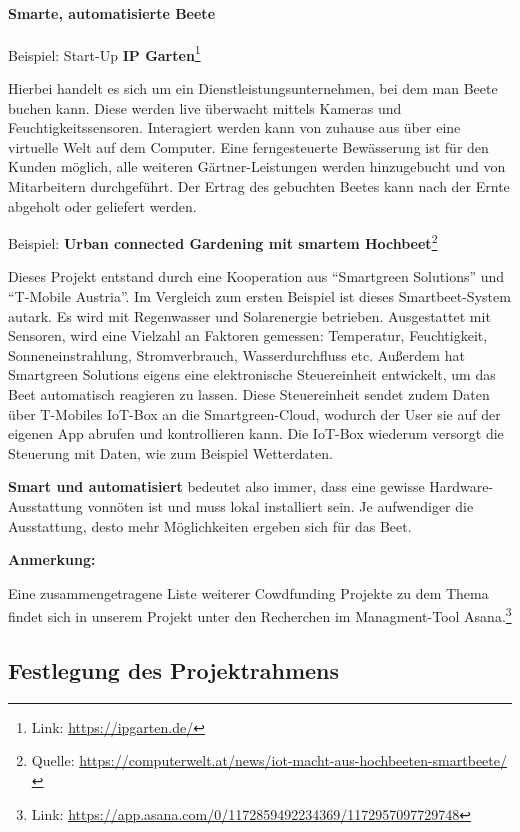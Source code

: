 \hypertarget{smarte-automatisierte-beete}{%
\paragraph{Smarte, automatisierte
Beete}\label{smarte-automatisierte-beete}}

Beispiel: Start-Up \textbf{IP Garten}\footnote{Link:
  \url{https://ipgarten.de/}}

Hierbei handelt es sich um ein Dienstleistungsunternehmen, bei dem man
Beete buchen kann. Diese werden live überwacht mittels Kameras und
Feuchtigkeitssensoren. Interagiert werden kann von zuhause aus über eine
virtuelle Welt auf dem Computer. Eine ferngesteuerte Bewässerung ist für
den Kunden möglich, alle weiteren Gärtner-Leistungen werden hinzugebucht
und von Mitarbeitern durchgeführt. Der Ertrag des gebuchten Beetes kann
nach der Ernte abgeholt oder geliefert werden.

Beispiel: \textbf{Urban connected Gardening mit smartem
Hochbeet}\footnote{Quelle:
  \url{https://computerwelt.at/news/iot-macht-aus-hochbeeten-smartbeete/}}

Dieses Projekt entstand durch eine Kooperation aus ``Smartgreen
Solutions'' und ``T-Mobile Austria''. Im Vergleich zum ersten Beispiel
ist dieses Smartbeet-System autark. Es wird mit Regenwasser und
Solarenergie betrieben. Ausgestattet mit Sensoren, wird eine Vielzahl an
Faktoren gemessen: Temperatur, Feuchtigkeit, Sonneneinstrahlung,
Stromverbrauch, Wasserdurchfluss etc. Außerdem hat Smartgreen Solutions
eigens eine elektronische Steuereinheit entwickelt, um das Beet
automatisch reagieren zu lassen. Diese Steuereinheit sendet zudem Daten
über T-Mobiles IoT-Box an die Smartgreen-Cloud, wodurch der User sie auf
der eigenen App abrufen und kontrollieren kann. Die IoT-Box wiederum
versorgt die Steuerung mit Daten, wie zum Beispiel Wetterdaten.

\textbf{Smart und automatisiert} bedeutet also immer, dass eine gewisse
Hardware-Ausstattung vonnöten ist und muss lokal installiert sein. Je
aufwendiger die Ausstattung, desto mehr Möglichkeiten ergeben sich für
das Beet.

\textbf{Anmerkung:}

Eine zusammengetragene Liste weiterer Cowdfunding Projekte zu dem Thema
findet sich in unserem Projekt unter den Recherchen im Managment-Tool
Asana.\footnote{Link:
  \url{https://app.asana.com/0/1172859492234369/1172957097729748}}

\hypertarget{festlegung-des-projektrahmens}{%
\subsection{Festlegung des
Projektrahmens}\label{festlegung-des-projektrahmens}}

